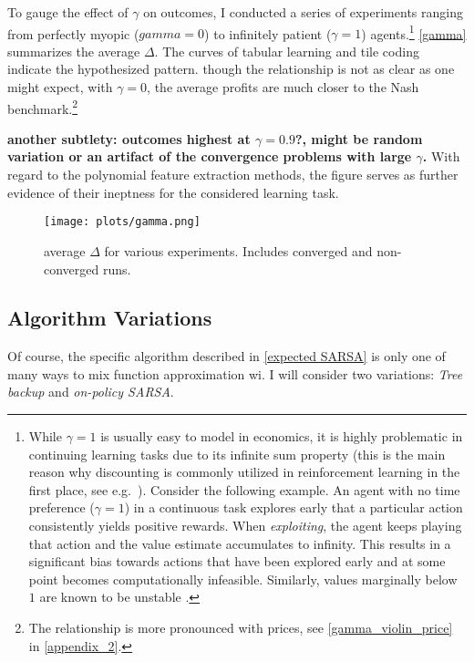 To gauge the effect of $\gamma$ on outcomes, I conducted a series of experiments ranging from perfectly myopic ($gamma =0$) to infinitely patient ($\gamma = 1$) agents.\footnote{While $\gamma = 1$ is usually easy to model in economics, it is highly problematic in continuing learning tasks due to its infinite sum property (this is the main reason why discounting is commonly utilized in reinforcement learning in the first place, see e.g.\ \textcite{schwartz_reinforcement_1993}). Consider the following example. An agent with no time preference ($\gamma = 1$) in a continuous task explores  early that a particular action consistently yields positive rewards. When \emph{exploiting}, the agent keeps playing that action and the value estimate accumulates to infinity. This results in a significant bias towards actions that have been explored early and at some point becomes computationally infeasible. Similarly, values marginally below $1$ are known to be unstable \parencite{naik_discounted_2019}.} \autoref{gamma} summarizes the average $\Delta$. The curves of tabular learning and tile coding indicate the hypothesized pattern. though the relationship is not as clear as one might expect, with $\gamma = 0$, the average profits are much closer to the Nash benchmark.\footnote{The relationship is more pronounced with prices, see \autoref{gamma_violin_price} in \autoref{appendix_2}.}

\textbf{another subtlety: outcomes highest at $\gamma = 0.9$?, might be random variation or an artifact of the convergence problems with large $\gamma$. }
With regard to the polynomial feature extraction methods, the figure serves as further evidence of their ineptness for the considered learning task. 



\begin{figure}
	\texttt{[image: plots/gamma.png]}
	\caption{average $\Delta$ for various experiments. Includes converged and non-converged runs.}
	\label{gamma}
\end{figure}


\subsection{Algorithm Variations}\label{vary_algorithm}

Of course, the specific algorithm described in \autoref{expected SARSA} is only one of many ways to mix function approximation wi. I will consider two variations: \emph{Tree backup} and \emph{on-policy SARSA}.

